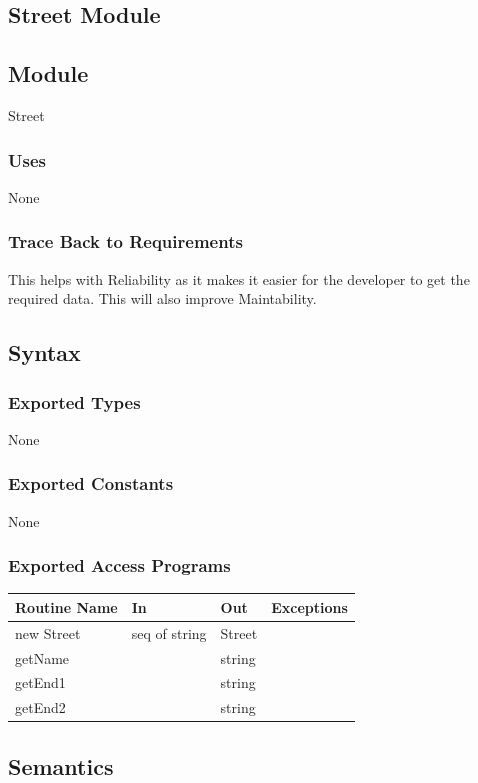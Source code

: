 \documentclass[12pt]{article}
\begin{document}
\newpage
\subsection{Street Module}
\subsection*{Module}
Street

\subsubsection*{Uses}
None

\subsubsection*{Trace Back to Requirements}
This helps with Reliability as it makes it easier for the developer to get the required data. This will also improve Maintability.

\subsection*{Syntax}
\subsubsection*{Exported Types}
None

\subsubsection*{Exported Constants}
None

\subsubsection*{Exported Access Programs}
    \begin{tabular}{|l|l|l|l|}
    \hline
    \textbf{Routine Name} & \textbf{In} & \textbf{Out} & \textbf{Exceptions}\\
    \hline
    new Street & seq of string & Street & ~\\
    \hline
    getName & ~ & string & ~\\
    \hline
    getEnd1 & ~ & string & ~\\
    \hline
    getEnd2 & ~ & string & ~\\
    \hline
    \end{tabular}
    
\subsection*{Semantics}
\end{document}
